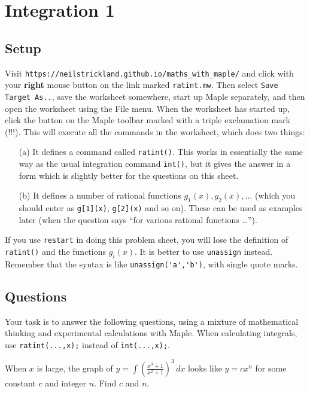 \documentclass[a4paper,10pt]{amsbook}
\numberwithin{example}{chapter}
\begin{document}
\chapter{Integration 1}

\section*{Setup}

Visit \verb~https://neilstrickland.github.io/maths_with_maple/~ and
click with your \textbf{right} mouse button on the link marked
\verb~ratint.mw~.  Then select \verb~Save Target As..~, save the
worksheet somewhere, start up Maple separately, and then open the
worksheet using the File menu.  When the worksheet has started up,
click the button on the Maple toolbar marked with a triple exclamation
mark (!!!).  This will execute all the commands in the worksheet,
which does two things:
\begin{itemize}
 \item[(a)] It defines a command called \verb~ratint()~.
  This works in essentially the same way as the usual
  integration command \verb~int()~, but it gives the answer
  in a form which is slightly better for the questions on
  this sheet.
 \item[(b)] It defines a number of rational functions
  $g_1(x),g_2(x),\dotsc$ (which you should enter as
  \verb~g[1](x)~, \verb~g[2](x)~ and so on).  These can be
  used as examples later (when the question says ``for
  various rational functions \ldots'').
\end{itemize}
If you use \verb~restart~ in doing this problem sheet, you
will lose the definition of \verb~ratint()~ and the
functions $g_i(x)$.  It is better to use \verb~unassign~
instead.  Remember that the syntax is like
\verb~unassign('a','b')~, with single quote marks.

\section*{Questions}

Your task is to answer the following questions, using a
mixture of mathematical thinking and experimental
calculations with Maple.  When calculating integrals, use
\verb~ratint(...,x);~ instead of \verb~int(...,x);~.

\begin{exercise}
 When $x$ is large, the graph of
 $y=\displaystyle\int\left(\frac{x^3+1}{x^2+1}\right)^3\,dx$
 looks like $y=cx^n$ for some constant $c$ and integer $n$.
 Find $c$ and $n$.
\end{exercise}
\end{document}
